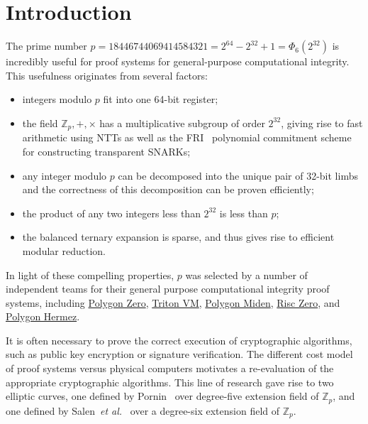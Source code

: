 \section{Introduction}

The prime number $p = 18446744069414584321 = 2^{64} - 2^{32} + 1 = \Phi_6(2^{32})$ is incredibly useful for proof systems for general-purpose computational integrity. This usefulness originates from several factors:
\begin{itemize}
 \item integers modulo $p$ fit into one 64-bit register;
 \item the field $\mathbb{Z}_p, +, \times$ has a multiplicative subgroup of order $2^{32}$, giving rise to fast arithmetic using NTTs as well as the FRI~\cite{fri} polynomial commitment scheme for constructing transparent SNARKs;
 \item any integer modulo $p$ can be decomposed into the unique pair of 32-bit limbs and the correctness of this decomposition can be proven efficiently;
 \item the product of any two integers less than $2^{32}$ is less than $p$;
 \item the balanced ternary expansion is sparse, and thus gives rise to efficient modular reduction.
\end{itemize}
In light of these compelling properties, $p$ was selected by a number of independent teams for their general purpose computational integrity proof systems, including \href{https://polygon.technology/solutions/polygon-zero/}{Polygon Zero}, \href{https://triton-vm.org}{Triton VM}, \href{https://polygon.technology/solutions/polygon-miden/}{Polygon Miden}, \href{https://www.risczero.com/}{Risc Zero}, and \href{https://polygon.technology/solutions/polygon-zkevm/}{Polygon Hermez}.

It is often necessary to prove the correct execution of cryptographic algorithms, such as public key encryption or signature verification. The different cost model of proof systems versus physical computers motivates a re-evaluation of the appropriate cryptographic algorithms. This line of research gave rise to two elliptic curves, one defined by Pornin~\cite{ecgfp5} over degree-five extension field of $\mathbb{Z}_p$, and one defined by Salen~\emph{et al.}~\cite{toposwarecurve} over a degree-six extension field of $\mathbb{Z}_p$.

